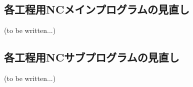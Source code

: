

\subsection{各工程用NCメインプログラムの見直し\TBW}
(to be written...)


\subsection{各工程用NCサブプログラムの見直し\TBW}
(to be written...)



